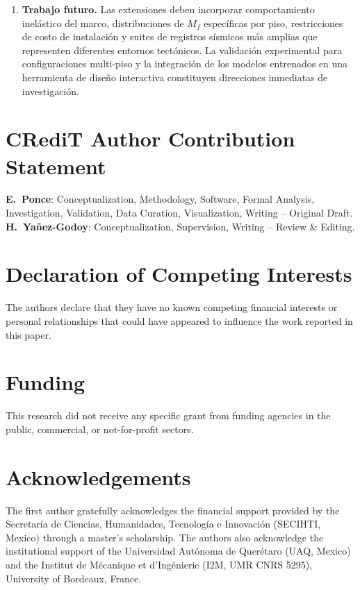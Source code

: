 \documentclass[preprint,12pt,authoryear]{elsarticle}
\newcommand{\Mf}{M_{\!f}}
\begin{document}
\begin{enumerate}
\item \textbf{Trabajo futuro.}
Las extensiones deben incorporar comportamiento inelástico del marco,
distribuciones de $\Mf$ específicas por piso, restricciones de costo de
instalación y suites de registros sísmicos más amplias que representen
diferentes entornos tectónicos. La validación experimental para
configuraciones multi-piso y la integración de los modelos entrenados en una
herramienta de diseño interactiva constituyen direcciones inmediatas de
investigación.

\end{enumerate}

\section*{CRediT Author Contribution Statement}

\textbf{E.~Ponce}: Conceptualization, Methodology, Software, Formal Analysis,
Investigation, Validation, Data Curation, Visualization, Writing -- Original Draft.
\textbf{H.~Yañez-Godoy}: Conceptualization, Supervision, Writing -- Review \& Editing.

\section*{Declaration of Competing Interests}

The authors declare that they have no known competing financial interests or
personal relationships that could have appeared to influence the work reported
in this paper.

\section*{Funding}

This research did not receive any specific grant from funding agencies in the
public, commercial, or not-for-profit sectors.

\section*{Acknowledgements}

The first author gratefully acknowledges the financial support provided by the
Secretaría de Ciencias, Humanidades, Tecnología e Innovación (SECIHTI, Mexico)
through a master's scholarship. The authors also acknowledge the institutional
support of the Universidad Autónoma de Querétaro (UAQ, Mexico) and the Institut
de Mécanique et d'Ingénierie (I2M, UMR CNRS 5295), University of Bordeaux,
France.
\end{document}
